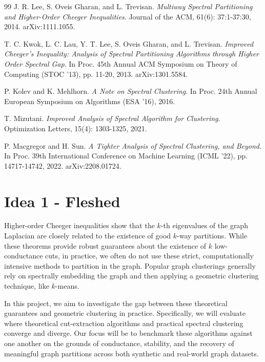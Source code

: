 \documentclass{article}
\theoremstyle{definition}
\theoremstyle{remark}
\begin{document}
\begin{thebibliography}{99}
J. R. Lee, S. Oveis Gharan, and L. Trevisan.
\textit{Multiway Spectral Partitioning and Higher-Order Cheeger Inequalities}.
Journal of the ACM, 61(6): 37:1-37:30, 2014. arXiv:1111.1055.

T. C. Kwok, L. C. Lau, Y. T. Lee, S. Oveis Gharan, and L. Trevisan.
\textit{Improved Cheeger's Inequality: Analysis of Spectral Partitioning Algorithms through Higher Order Spectral Gap}.
In Proc. 45th Annual ACM Symposium on Theory of Computing (STOC '13), pp. 11-20, 2013. arXiv:1301.5584.

P. Kolev and K. Mehlhorn.
\textit{A Note on Spectral Clustering}.
In Proc. 24th Annual European Symposium on Algorithms (ESA '16), 2016.

T. Mizutani.
\textit{Improved Analysis of Spectral Algorithm for Clustering}.
Optimization Letters, 15(4): 1303-1325, 2021.

P. Macgregor and H. Sun.
\textit{A Tighter Analysis of Spectral Clustering, and Beyond}.
In Proc. 39th International Conference on Machine Learning (ICML '22), pp. 14717-14742, 2022. arXiv:2208.01724.

\end{thebibliography}





\appendix


\section{Idea 1 - Fleshed}

Higher-order Cheeger inequalities show that the $k$-th eigenvalues of the graph Laplacian are closely related to the existence of good $k$-way partitions. While these theorems provide robust guarantees about the existence of $k$ low-conductance cuts, in practice, we often do not use these strict, computationally intensive methods to partition in the graph. Popular graph clusterings generally rely on spectrally embedding the graph and then applying a geometric clustering technique, like $k$-means.

In this project, we aim to investigate the gap between these theoretical guarantees and geometric clustering in practice. Specifically, we will evaluate where theoretical cut-extraction algorithms and practical spectral clustering converge and diverge. Our focus will be to benchmark these algorithms against one another on the grounds of conductance, stability, and the recovery of meaningful graph partitions across both synthetic and real-world graph datasets.
\end{document}

